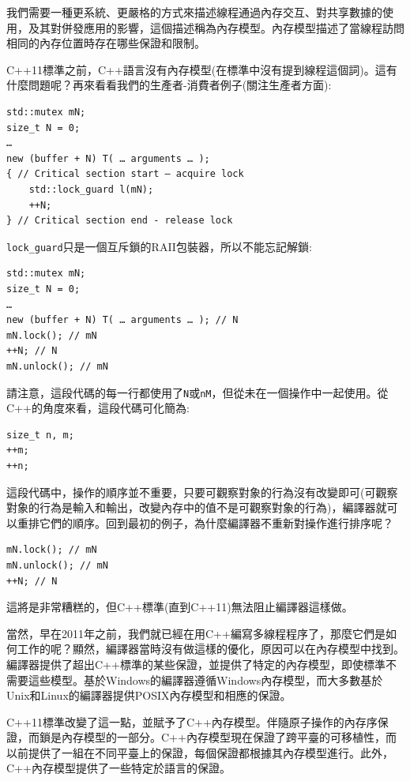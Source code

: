 我們需要一種更系統、更嚴格的方式來描述線程通過內存交互、對共享數據的使用，及其對併發應用的影響，這個描述稱為內存模型。內存模型描述了當線程訪問相同的內存位置時存在哪些保證和限制。

C++11標準之前，C++語言沒有內存模型(在標準中沒有提到線程這個詞)。這有什麼問題呢？再來看看我們的生產者-消費者例子(關注生產者方面):

\begin{lstlisting}[style=styleCXX]
std::mutex mN;
size_t N = 0;
…
new (buffer + N) T( … arguments … );
{ // Critical section start – acquire lock
	std::lock_guard l(mN);
	++N;
} // Critical section end - release lock
\end{lstlisting}

\texttt{lock\_guard}只是一個互斥鎖的RAII包裝器，所以不能忘記解鎖:

\begin{lstlisting}[style=styleCXX]
std::mutex mN;
size_t N = 0;
…
new (buffer + N) T( … arguments … ); // N
mN.lock(); // mN
++N; // N
mN.unlock(); // mN
\end{lstlisting}

請注意，這段代碼的每一行都使用了\texttt{N}或\texttt{nM}，但從未在一個操作中一起使用。從C++的角度來看，這段代碼可化簡為:

\begin{lstlisting}[style=styleCXX]
size_t n, m;
++m;
++n;
\end{lstlisting}

這段代碼中，操作的順序並不重要，只要可觀察對象的行為沒有改變即可(可觀察對象的行為是輸入和輸出，改變內存中的值不是可觀察對象的行為)，編譯器就可以重排它們的順序。回到最初的例子，為什麼編譯器不重新對操作進行排序呢？

\begin{lstlisting}[style=styleCXX]
mN.lock(); // mN
mN.unlock(); // mN
++N; // N
\end{lstlisting}

這將是非常糟糕的，但C++標準(直到C++11)無法阻止編譯器這樣做。

當然，早在2011年之前，我們就已經在用C++編寫多線程程序了，那麼它們是如何工作的呢？顯然，編譯器當時沒有做這樣的優化，原因可以在內存模型中找到。編譯器提供了超出C++標準的某些保證，並提供了特定的內存模型，即使標準不需要這些模型。基於Windows的編譯器遵循Windows內存模型，而大多數基於Unix和Linux的編譯器提供POSIX內存模型和相應的保證。

C++11標準改變了這一點，並賦予了C++內存模型。伴隨原子操作的內存序保證，而鎖是內存模型的一部分。C++內存模型現在保證了跨平臺的可移植性，而以前提供了一組在不同平臺上的保證，每個保證都根據其內存模型進行。此外，C++內存模型提供了一些特定於語言的保證。

